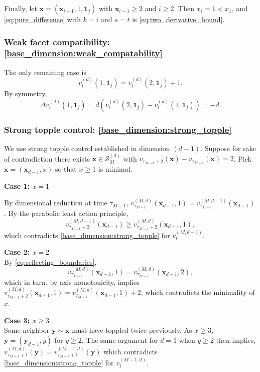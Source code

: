 \documentclass[12pt]{amsart}
\begin{document}
Finally, let $\mathbf{x} = (\mathbf{x}_{i-1}, 1, \mathbf{1}_j)$ with $\mathbf{x}_{i-1} \geq 2$ and $i \geq 2$.
Then $x_i = 1 < x_1$, and \eqref{eq:pure_difference} with $k = i$ and $s = t$ is \eqref{eq:two_derivative_bound}.





\subsubsection*{Weak facet compatibility: \eqref{base_dimension:weak_compatability}}
The only remaining case is 
\[
v_t^{(d)}(1, \mathbf{1}_j) = v_{t}^{(d)}(2,\mathbf{1}_j) + 1.
\]
By symmetry, 
\[
\Delta v_t^{(d)}(1, \mathbf{1}_j) = d (v_t^{(d)}(2, \mathbf{1}_j) - v_t^{(d)}(1, \mathbf{1}_j)) = -d.
\]


\subsubsection*{Strong topple control: \eqref{base_dimension:strong_topple}}
We use strong topple control established in dimension $(d-1)$.  Suppose for sake of contradiction 
there exists $\mathbf{x} \in \mathcal{S}_M^{(d)}$ with $v_{\tau_{M-1}+2}(\mathbf{x}) - v_{\tau_{M-1}}(\mathbf{x}) = 2$.
Pick $\mathbf{x} = (\mathbf{x}_{d-1}, x)$ so that $x \geq 1$ is minimal. 

{\bf Case 1: $x = 1$}

By dimensional reduction at time $\tau_{M-1}$, $v_{\tau_{M-1}}^{(M,d)}(\mathbf{x}_{d-1},1) = v_{\tau_{M-1}}^{(M,d-1)}(\mathbf{x}_{d-1})$.
By the parabolic least action principle, 
\[
v_{\tau_{M-1}+2}^{(M,d-1)}(\mathbf{x}_{d-1}) \geq v_{\tau_{M-1}+2}^{(M,d)}(\mathbf{x}_{d-1},1),
\]
which contradicts \eqref{base_dimension:strong_topple} for $v_{t}^{(M,d-1)}$. 


{\bf Case 2: $x = 2$} \\
By \eqref{eq:reflecting_boundaries}, 
\[
v_{\tau_{M-1}}^{(M,d)}(\mathbf{x}_{d-1},1) = v_{\tau_{M-1}}^{(M,d)}(\mathbf{x}_{d-1},2),
\]
which in turn, by axis monotonicity, implies
$v_{\tau_{M-1}+2}^{(M,d)}(\mathbf{x}_{d-1},1) = v_{\tau_{M-1}}^{(M,d)}(\mathbf{x}_{d-1},1)+2$,
which contradicts the minimality of $x$.



{\bf Case 3: $x \geq 3$}  \\
Some neighbor $\mathbf{y} \sim \mathbf{x}$ must have toppled twice previously. As $x \geq 3$, $\mathbf{y} = (\mathbf{y}_{d-1}, y)$ for $y \geq 2$. The same argument for $d=1$ when $y \geq 2$ then implies, $v_{\tau_{M-1}+1}^{(M,d)}(\mathbf{y}) =  v_{\tau_{M-1}+1}^{(M-1,d)}(\mathbf{y})$ which contradicts \eqref{base_dimension:strong_topple} for $v_{t}^{(M-1,d)}$.  
\end{document}
